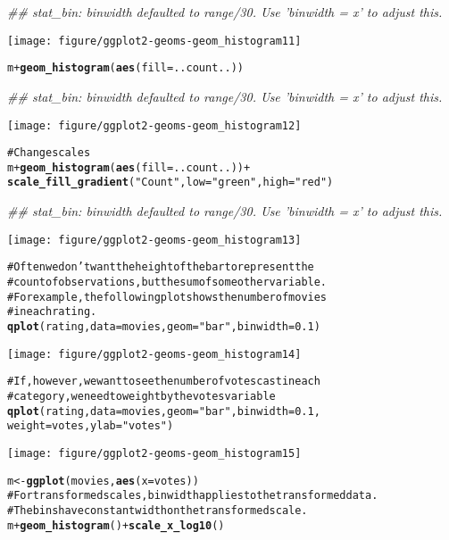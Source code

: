 \documentclass[a4paper,titlepage]{tufte-handout}\usepackage{graphicx, color}
\makeatletter
\def\maxwidth{ %
  \ifdim\Gin@nat@width>\linewidth
    \linewidth
  \else
    \Gin@nat@width
  \fi
}
\newcommand{\hlfunctioncall}[1]{\textcolor[rgb]{0.501960784313725,0,0.329411764705882}{\textbf{#1}}}%
\newcommand{\hlstring}[1]{\textcolor[rgb]{0.6,0.6,1}{#1}}%
\newcommand{\hlcomment}[1]{\textcolor[rgb]{0.180392156862745,0.6,0.341176470588235}{#1}}%
\newenvironment{kframe}{%
 \def\at@end@of@kframe{}%
 \ifinner\ifhmode%
  \def\at@end@of@kframe{\end{minipage}}%
  \begin{minipage}{\columnwidth}%
 \fi\fi%
 \def\FrameCommand##1{\hskip\@totalleftmargin \hskip-\fboxsep
 \colorbox{shadecolor}{##1}\hskip-\fboxsep
     \hskip-\linewidth \hskip-\@totalleftmargin \hskip\columnwidth}%
 \MakeFramed {\advance\hsize-\width
   \@totalleftmargin\z@ \linewidth\hsize
   \@setminipage}}%
 {\par\unskip\endMakeFramed%
 \at@end@of@kframe}
\newenvironment{knitrout}{}{} %
\makeatother
\begin{document}
\begin{knitrout}
\begin{kframe}
{\ttfamily\noindent\itshape\textcolor{messagecolor}{\#\# stat\_bin: binwidth defaulted to range/30. Use 'binwidth = x' to adjust this.}}\end{kframe}\texttt{[image: figure/ggplot2-geoms-geom\_histogram11]} \begin{kframe}\begin{alltt}
m + \hlfunctioncall{geom_histogram}(\hlfunctioncall{aes}(fill = ..count..))
\end{alltt}


{\ttfamily\noindent\itshape\textcolor{messagecolor}{\#\# stat\_bin: binwidth defaulted to range/30. Use 'binwidth = x' to adjust this.}}\end{kframe}\texttt{[image: figure/ggplot2-geoms-geom\_histogram12]} \begin{kframe}\begin{alltt}
\hlcomment{# Change scales}
m + \hlfunctioncall{geom_histogram}(\hlfunctioncall{aes}(fill = ..count..)) +
  \hlfunctioncall{scale_fill_gradient}(\hlstring{"Count"}, low = \hlstring{"green"}, high = \hlstring{"red"})
\end{alltt}


{\ttfamily\noindent\itshape\textcolor{messagecolor}{\#\# stat\_bin: binwidth defaulted to range/30. Use 'binwidth = x' to adjust this.}}\end{kframe}\texttt{[image: figure/ggplot2-geoms-geom\_histogram13]} \begin{kframe}\begin{alltt}
\hlcomment{# Often we don't want the height of the bar to represent the}
\hlcomment{# count of observations, but the sum of some other variable.}
\hlcomment{# For example, the following plot shows the number of movies}
\hlcomment{# in each rating.}
\hlfunctioncall{qplot}(rating, data=movies, geom=\hlstring{"bar"}, binwidth = 0.1)
\end{alltt}
\end{kframe}\texttt{[image: figure/ggplot2-geoms-geom\_histogram14]} \begin{kframe}\begin{alltt}
\hlcomment{# If, however, we want to see the number of votes cast in each}
\hlcomment{# category, we need to weight by the votes variable}
\hlfunctioncall{qplot}(rating, data=movies, geom=\hlstring{"bar"}, binwidth = 0.1,
  weight=votes, ylab = \hlstring{"votes"})
\end{alltt}
\end{kframe}\texttt{[image: figure/ggplot2-geoms-geom\_histogram15]} \begin{kframe}\begin{alltt}
m <- \hlfunctioncall{ggplot}(movies, \hlfunctioncall{aes}(x = votes))
\hlcomment{# For transformed scales, binwidth applies to the transformed data.}
\hlcomment{# The bins have constant width on the transformed scale.}
m + \hlfunctioncall{geom_histogram}() + \hlfunctioncall{scale_x_log10}()
\end{alltt}



\end{kframe}
\end{knitrout}
\end{document}

